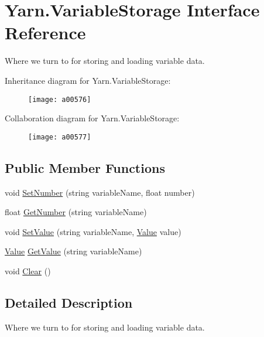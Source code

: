 \hypertarget{a00167}{\section{Yarn.\-Variable\-Storage Interface Reference}
\label{a00167}
}


Where we turn to for storing and loading variable data.  




Inheritance diagram for Yarn.\-Variable\-Storage\-:
\nopagebreak
\begin{figure}[H]
\begin{center}
\leavevmode
\texttt{[image: a00576]}
\end{center}
\end{figure}


Collaboration diagram for Yarn.\-Variable\-Storage\-:
\nopagebreak
\begin{figure}[H]
\begin{center}
\leavevmode
\texttt{[image: a00577]}
\end{center}
\end{figure}
\subsection*{Public Member Functions}
\begin{DoxyCompactItemize}
\item 
void \hyperlink{a00167_aa28c3694f985cf73489efc301b9d41dd}{Set\-Number} (string variable\-Name, float number)
\item 
float \hyperlink{a00167_a04b061c52d8ac814ce559da5286fbc71}{Get\-Number} (string variable\-Name)
\item 
void \hyperlink{a00167_aa90ff61224432c5ed3ce72199c55f440}{Set\-Value} (string variable\-Name, \hyperlink{a00165}{Value} value)
\item 
\hyperlink{a00165}{Value} \hyperlink{a00167_accab1fc5c8fc353dbfc53ca0f4029576}{Get\-Value} (string variable\-Name)
\item 
void \hyperlink{a00167_af98c1e41f351cb96e13f668ca2fd9d92}{Clear} ()
\end{DoxyCompactItemize}


\subsection{Detailed Description}
Where we turn to for storing and loading variable data. 

